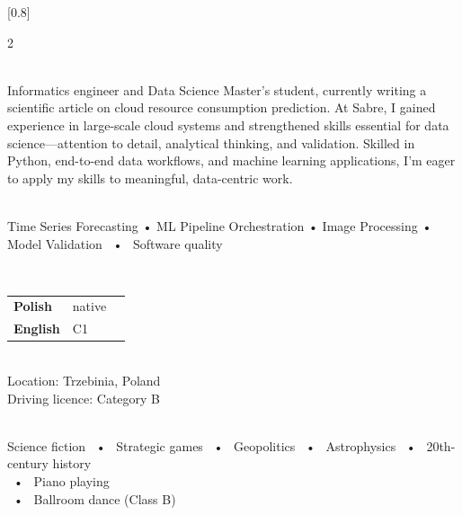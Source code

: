 \documentclass[darkhipster]{simplehipstercv}
\begin{document}
\setlength{\columnsep}{2em}
[0.8]
\begin{paracol}{2}

\paracolbackgroundoptions



\footnotesize
{\setasidefontcolour

\flushright

\vspace{0.4em}
\\[0.5em]

{\footnotesize
Informatics engineer and Data Science Master's student, currently writing a scientific article on cloud resource consumption prediction. At Sabre, I gained experience in large-scale cloud systems and strengthened skills essential for data science—attention to detail, analytical thinking, and validation. Skilled in Python, end-to-end data workflows, and machine learning applications, I'm eager to apply my skills to meaningful, data-centric work.}
\bigskip

 \\[0.5em]
Time Series Forecasting • ML Pipeline Orchestration • Image Processing • Model Validation ~•~ Software quality 
\bigskip

\\[0.5em]
\begin{tabular}{l | ll}
\textbf{Polish} & native \\
\textbf{English} & C1 \\
\end{tabular}
\bigskip

 \\[0.5em]
Location: Trzebinia, Poland\\
Driving licence: Category B\\
\bigskip

\\[0.5em]
Science fiction ~•~ Strategic games ~•~ Geopolitics ~•~ Astrophysics ~•~ 20th-century history\\ ~•~ Piano playing\\ ~•~ Ballroom dance (Class B)
\bigskip

\phantom{turn the page}

}
\end{paracol}
\end{document}
